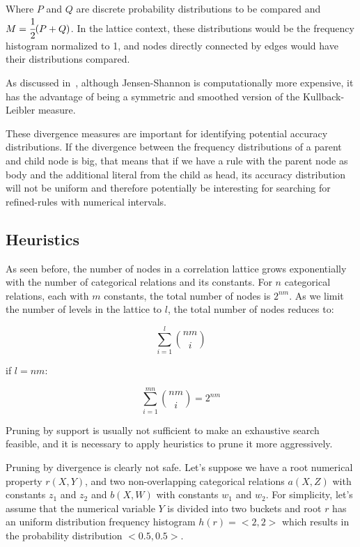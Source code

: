 Where $P$ and $Q$ are discrete probability distributions to be compared and $M=\cfrac{1}{2}(P+Q)$. In the lattice
context, these distributions would be the frequency histogram normalized to 1, and nodes directly connected by edges
would have their distributions compared.

As discussed in~\cite{17795}, although Jensen-Shannon is computationally more expensive, it has the advantage of being
a symmetric and smoothed version of the Kullback-Leibler measure.

These divergence measures are important for identifying potential accuracy distributions. If the divergence between
the
frequency distributions of a parent and child node is big, that means that if we have a rule with the parent node as
body and the additional literal from the child as head, its accuracy distribution will not be uniform and therefore
potentially be interesting for searching for refined-rules with numerical intervals.


\subsection{Heuristics}
\label{sec:heuristics}

As seen before, the number of nodes in a correlation lattice grows exponentially with the number of categorical
relations and its constants. For $n$ categorical relations, each with $m$ constants, the total number of nodes is
$2^{nm}$. As we limit the number of levels in the lattice to $l$, the total number of nodes reduces to:

\begin{center}
  \begin{equation}
    \sum_{i=1}^{l}\binom{nm}{i}
  \end{equation}
\end{center}

if $l=nm$:

\begin{center}
  \begin{equation}
    \sum_{i=1}^{mn}\binom{nm}{i} = 2^{nm}
  \end{equation}
\end{center}


Pruning by support is usually not sufficient to make an exhaustive search feasible, and it is necessary to apply
heuristics to prune it more aggressively.


Pruning by divergence is clearly not safe. Let's suppose we have a root numerical property $r(X,Y)$, and two
non-overlapping categorical relations $a(X,Z)$ with constants $z_1$ and $z_2$ and $b(X,W)$ with constants $w_1$ and
$w_2$. For simplicity, let's assume that the numerical variable $Y$ is divided into two buckets and root $r$ has an
uniform distribution frequency histogram $h(r)=<2,2>$ which results in the probability distribution $<0.5,0.5>$.

